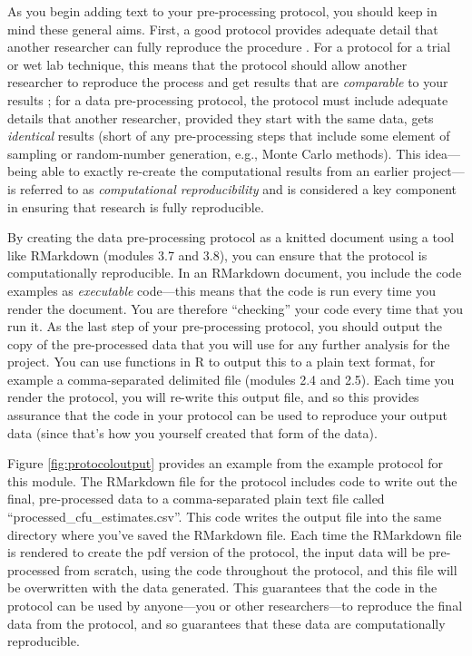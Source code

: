 \documentclass[]{tufte-book}
\begin{document}
As you begin adding text to your pre-processing protocol, you should keep in
mind these general aims. First, a good protocol provides adequate detail that
another researcher can fully reproduce the procedure \citep{al2016protocol}. For a
protocol for a trial or wet lab technique, this means that the protocol should
allow another researcher to reproduce the process and get results that are
\emph{comparable} to your results \citep{al2016protocol}; for a data pre-processing
protocol, the protocol must include adequate details that another researcher,
provided they start with the same data, gets \emph{identical} results (short of any
pre-processing steps that include some element of sampling or random-number
generation, e.g., Monte Carlo methods). This idea---being able to exactly
re-create the computational results from an earlier project---is referred to as
\emph{computational reproducibility} and is considered a key component in
ensuring that research is fully reproducible.

By creating the data pre-processing protocol as a knitted document
using a tool like RMarkdown (modules 3.7 and 3.8), you can ensure that the protocol is
computationally reproducible. In an RMarkdown document, you include the code
examples as \emph{executable} code---this means that the code is run every time you
render the document. You are therefore ``checking'' your code every time that you
run it. As the last step of your pre-processing protocol, you should output the
copy of the pre-processed data that you will use for any further analysis for
the project. You can use functions in R to output this to a plain text format,
for example a comma-separated delimited file (modules 2.4 and 2.5). Each time you render
the protocol, you will re-write this output file, and so this provides assurance
that the code in your protocol can be used to reproduce your output data (since
that's how you yourself created that form of the data).

Figure \ref{fig:protocoloutput} provides an example from the example protocol
for this module. The RMarkdown file for the protocol includes code to write out
the final, pre-processed data to a comma-separated plain text file called
``processed\_cfu\_estimates.csv''. This code writes the output file into the same
directory where you've saved the RMarkdown file. Each time the RMarkdown file is
rendered to create the pdf version of the protocol, the input data will be
pre-processed from scratch, using the code throughout the protocol, and this
file will be overwritten with the data generated. This guarantees that the code
in the protocol can be used by anyone---you or other researchers---to reproduce
the final data from the protocol, and so guarantees that these data are
computationally reproducible.
\end{document}
